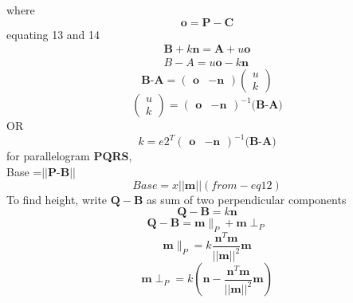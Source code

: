 \documentclass[journal,10pt,twocolumn]{article}
\begin{document}
where
\begin{equation}
	\boldsymbol{o}=\boldsymbol{P}-\boldsymbol{C}    
\end{equation}
equating 13 and 14
\begin{eqnarray}
	\boldsymbol{B}+k\boldsymbol{n}=\boldsymbol{A}+u\boldsymbol{o}\\
    B-A=u\boldsymbol{o}-k\boldsymbol{n}
    \end{eqnarray}
\begin{equation}
	\textbf{B-A}=
\begin{pmatrix}
    \boldsymbol{o} & -\boldsymbol{n}
\end{pmatrix}
\begin{pmatrix}
    u\\
    k
\end{pmatrix}
\end{equation}
\begin{equation}
\begin{pmatrix}
    u\\
    k
\end{pmatrix}
=
\begin{pmatrix}
    \boldsymbol{o} & -\boldsymbol{n}
\end{pmatrix}^{-1}
	\textbf{(B-A)}
\end{equation}
OR
\begin{equation}
k={e2}^T
\begin{pmatrix}
    \boldsymbol{o} & -\boldsymbol{n}
\end{pmatrix}^{-1}
	\textbf{(B-A)}
\end{equation}
for parallelogram \textbf{PQRS}, \\
Base =$||\boldsymbol{P}$-$\boldsymbol{B}||$
\begin{equation}
Base=x||\boldsymbol{m}||(from-eq12)
\end{equation}
To find height, write $\boldsymbol{Q}-\boldsymbol{B}$ as sum of two perpendicular components
\begin{equation}
    \boldsymbol{Q}-\boldsymbol{B}=k\boldsymbol{n}
\end{equation}
\begin{equation}
    \boldsymbol{Q}-\boldsymbol{B}=\boldsymbol{m} \parallel_P +\boldsymbol{m} \perp_P
\end{equation}
\begin{equation}
    \boldsymbol{m} \parallel_P=k{\frac{\boldsymbol{n}^T\boldsymbol{m}}{||\boldsymbol{m}||^2}}\boldsymbol{m}
\end{equation}
\begin{equation}
\boldsymbol{m} \perp_P=k(\boldsymbol{n}-{\frac{\boldsymbol{n}^T\boldsymbol{m}}{||\boldsymbol{m}||^2}}\boldsymbol{m})
\end{equation}
\end{document}
